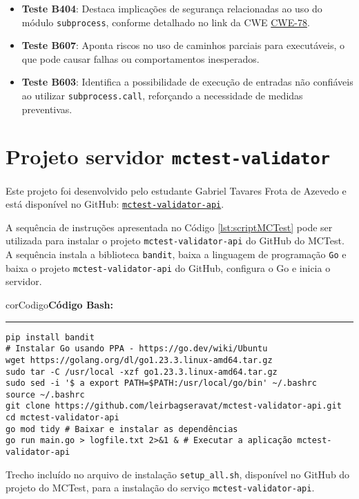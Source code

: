 \begin{itemize}
    \item \textbf{Teste B404}: Destaca implicações de segurança relacionadas ao uso do módulo \texttt{subprocess}, conforme detalhado no link da CWE \href{https://cwe.mitre.org/data/definitions/78.html}{CWE-78}.
    \item \textbf{Teste B607}: Aponta riscos no uso de caminhos parciais para executáveis, o que pode causar falhas ou comportamentos inesperados.
    \item \textbf{Teste B603}: Identifica a possibilidade de execução de entradas não confiáveis ao utilizar \texttt{subprocess.call}, reforçando a necessidade de medidas preventivas.
\end{itemize}


\section{Projeto servidor \texttt{mctest-validator}}\label{sec:projeto-servidor-mctest-validator}

Este projeto foi desenvolvido pelo estudante Gabriel Tavares Frota de Azevedo e está disponível no GitHub: \href{https://github.com/leirbagseravat/mctest-validator-api}{\texttt{mctest-validator-api}}.


A sequência de instruções apresentada no Código \ref{lst:scriptMCTest} pode ser utilizada para instalar o projeto \texttt{mctest-validator-api} do GitHub do MCTest. A sequência instala a biblioteca \texttt{bandit}, baixa a linguagem de programação \texttt{Go} e baixa o projeto \texttt{mctest-validator-api} do GitHub, configura o Go e inicia o servidor.

\begin{listing}[!ht]
\begin{myboxCode}{corCodigo}{\textbf{Código Bash: }}\vspace{3mm}
\hrule
\begin{verbatim}
pip install bandit
# Instalar Go usando PPA - https://go.dev/wiki/Ubuntu
wget https://golang.org/dl/go1.23.3.linux-amd64.tar.gz
sudo tar -C /usr/local -xzf go1.23.3.linux-amd64.tar.gz
sudo sed -i '$ a export PATH=$PATH:/usr/local/go/bin' ~/.bashrc
source ~/.bashrc
git clone https://github.com/leirbagseravat/mctest-validator-api.git
cd mctest-validator-api
go mod tidy # Baixar e instalar as dependências
go run main.go > logfile.txt 2>&1 & # Executar a aplicação mctest-validator-api
\end{verbatim}
\end{myboxCode}
\caption{Trecho incluído no arquivo de instalação \texttt{setup\_all.sh}, disponível no GitHub do projeto do MCTest, para a instalação do serviço \texttt{mctest-validator-api}.}
\label{lst:scriptMCTest}
\end{listing}

